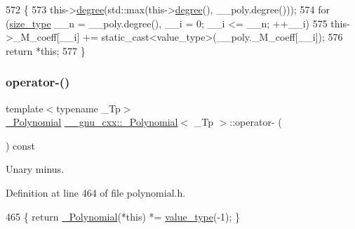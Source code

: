 \begin{DoxyCode}
572         \{
573           this->\hyperlink{class____gnu__cxx_1_1__Polynomial_a07d9933aeeb9afbd823218ed921336cb}{degree}(std::max(this->\hyperlink{class____gnu__cxx_1_1__Polynomial_a07d9933aeeb9afbd823218ed921336cb}{degree}(), \_\_poly.degree()));
574           \textcolor{keywordflow}{for} (\hyperlink{class____gnu__cxx_1_1__Polynomial_a8b25fcfd4acaad0c5c08b649c22da28a}{size\_type} \_\_n = \_\_poly.degree(), \_\_i = 0; \_\_i <= \_\_n; ++\_\_i)
575             this->\_M\_coeff[\_\_i] += static\_cast<value\_type>(\_\_poly.\_M\_coeff[\_\_i]);
576           \textcolor{keywordflow}{return} *\textcolor{keyword}{this};
577         \}
\end{DoxyCode}
\mbox{\label{class____gnu__cxx_1_1__Polynomial_a814ac6ceea7d2b6d42c371b4d631b47f}} 
\subsubsection{\texorpdfstring{operator-\/()}{operator-()}}
{\footnotesize\ttfamily template$<$typename \+\_\+\+Tp$>$ \\
\hyperlink{class____gnu__cxx_1_1__Polynomial}{\+\_\+\+Polynomial} \hyperlink{class____gnu__cxx_1_1__Polynomial}{\+\_\+\+\_\+gnu\+\_\+cxx\+::\+\_\+\+Polynomial}$<$ \+\_\+\+Tp $>$\+::operator-\/ (\begin{DoxyParamCaption}{ }\end{DoxyParamCaption}) const\hspace{0.3cm}{\ttfamily [inline]}}

Unary minus. 

Definition at line 464 of file polynomial.\+h.


\begin{DoxyCode}
465       \{ \textcolor{keywordflow}{return} \hyperlink{class____gnu__cxx_1_1__Polynomial_ad2baf4c12b7e3ab131a592afa3f391ae}{\_Polynomial}(*\textcolor{keyword}{this}) *= \hyperlink{class____gnu__cxx_1_1__Polynomial_a725563351f50e76084a7a016c06f8a53}{value\_type}(-1); \}
\end{DoxyCode}
\mbox{\label{class____gnu__cxx_1_1__Polynomial_a4fa6ae9adb4c4f946839d29b033ededb}} 
